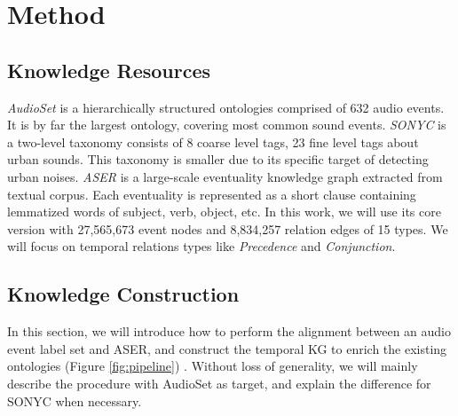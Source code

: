 \section{Method}
\label{sec:method}

\subsection{Knowledge Resources}
\label{sec:resources}

\textit{AudioSet} \citep{gemmeke2017audio} is a hierarchically structured ontologies comprised of 632 audio events. It is by far the largest ontology, covering most common sound events. 
\textit{SONYC} \citep{bello2019sonyc} is a two-level taxonomy consists of 8 coarse level tags, 23 fine level tags about urban sounds. This taxonomy is smaller due to its specific target of detecting urban noises.
\textit{ASER} \citep{zhang2020aser} is a large-scale eventuality knowledge graph extracted from textual corpus. Each eventuality is represented as a short clause containing lemmatized words of subject, verb, object, etc. In this work, we will use its core version with 27,565,673 event nodes and 8,834,257 relation edges of 15 types. We will focus on temporal relations types like \textit{Precedence} and \textit{Conjunction}.

\subsection{Knowledge Construction}
\label{sec:enrich}
In this section, we will introduce how to perform the alignment between an audio event label set and ASER, and construct the temporal KG to enrich the existing ontologies (Figure \ref{fig:pipeline}) . Without loss of generality, we will mainly describe the procedure with AudioSet as target, and explain the difference for SONYC when necessary. 

